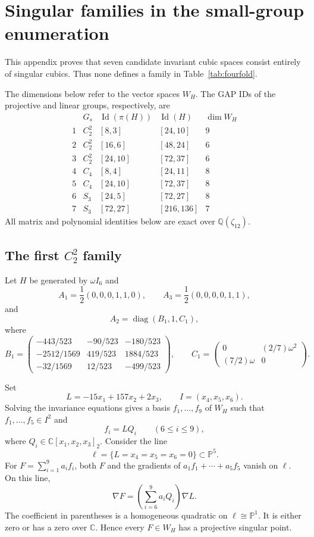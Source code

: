 \documentclass[12pt]{amsart}
\numberwithin{equation}{section}
\theoremstyle{plain}
\theoremstyle{definition}
\theoremstyle{remark}
\newcommand{\CC}{\mathbb C}
\newcommand{\PP}{\mathbb P}
\DeclareMathOperator{\diag}{diag}
\begin{document}
\appendix
\section{Singular families in the small-group enumeration}
\label{app:singular-families}

This appendix proves that seven candidate invariant cubic spaces consist
entirely of singular cubics.  Thus none defines a family in
Table~\ref{tab:fourfold}.

The dimensions below refer to the vector spaces $W_H$.  The GAP IDs
of the projective and linear groups, respectively, are
\[
\begin{array}{c|c|c|c|c}
 &G_s&\operatorname{Id}(\pi(H))&\operatorname{Id}(H)&\dim W_H\\ \hline
1&C_2^2&[8,3]&[24,10]&9\\
2&C_2^2&[16,6]&[48,24]&6\\
3&C_2^2&[24,10]&[72,37]&6\\
4&C_4&[8,4]&[24,11]&8\\
5&C_4&[24,10]&[72,37]&8\\
6&S_3&[24,5]&[72,27]&8\\
7&S_3&[72,27]&[216,136]&7
\end{array}
\]
All matrix and polynomial identities below are exact over
$\mathbb Q(\zeta_{12})$.

\subsection{The first $C_2^2$ family}

Let $H$ be generated by $\omega I_6$ and
\[
 A_1=\frac12(0,0,0,1,1,0),\qquad
 A_3=\frac12(0,0,0,0,1,1),
\]
and
\[
 A_2=\diag(B_1,1,C_1),
\]
where
\[
 B_1=
 \begin{pmatrix}
 -443/523&-90/523&-180/523\\
 -2512/1569&419/523&1884/523\\
 -32/1569&12/523&-499/523
 \end{pmatrix},\qquad
 C_1=
 \begin{pmatrix}
 0&(2/7)\omega^2\\
 (7/2)\omega&0
 \end{pmatrix}.
\]

Set
\[
 L=-15x_1+157x_2+2x_3,\qquad
 I=(x_4,x_5,x_6).
\]
Solving the invariance equations gives a basis $f_1,\ldots,f_9$ of
$W_H$ such that $f_1,\ldots,f_5\in I^2$ and
\[
 f_i=LQ_i\qquad (6\leq i\leq9),
\]
where $Q_i\in\CC[x_1,x_2,x_3]_2$.
Consider the line
\[
 \ell=\{L=x_4=x_5=x_6=0\}\subset\PP^5.
\]
For $F=\sum_{i=1}^9a_if_i$, both $F$ and the gradients of
$a_1f_1+\cdots+a_5f_5$ vanish on $\ell$.  On this line,
\[
 \nabla F=\left(\sum_{i=6}^9a_iQ_i\right)\nabla L.
\]
The coefficient in parentheses is a homogeneous quadratic on
$\ell\cong\PP^1$.  It is either zero or has a zero over $\CC$.  Hence every
$F\in W_H$ has a projective singular point.
\end{document}
